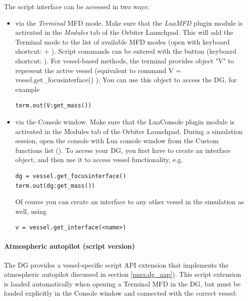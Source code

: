 \documentclass[Orbiter User Manual.tex]{subfiles}
\begin{document}
The script interface can be accessed in two ways:

\begin{itemize}
	\item via the \emph{Terminal} MFD mode. Make sure that the \emph{LuaMFD}
		plugin module is activated in the \emph{Modules} tab of the Orbiter
		Launchpad. This will add the Terminal mode to the list of available MFD
		modes (open with keyboard shortcut:  + ). Script
		commands can be entered with the  button (keyboard shortcut:
		). For vessel-based methods, the terminal provides object "V"
		to represent the active vessel (equivalent to command V =
		vessel.get\_focusinterface() ). You can use this object to access the
		DG, for example

\begin{lstlisting}[language=OSFS]
term.out(V:get_mass())
\end{lstlisting}

	\item via the Console window. Make sure that the LuaConsole plugin module is
		activated in the Modules tab of the Orbiter Launchpad. During a
		simulation session, open the console with Lua console window from the
		Custom functions list (). To access your DG, you
		first have to create an interface object, and then use it to access
		vessel functionality, e.g.

\begin{lstlisting}[language=OSFS]
dg = vessel.get_focusinterface()
term.out(dg:get_mass())
\end{lstlisting}

		Of course you can create an interface to any other vessel in the
		simulation as well, using

\begin{lstlisting}[language=OSFS]
v = vessel.get_interface(<name>)
\end{lstlisting}
\end{itemize}

\paragraph{Atmospheric autopilot (script version)}
The DG provides a vessel-specific script API extension that implements the
atmospheric autopilot discussed in section \ref{para:dg_aap}). This script
extension is loaded automatically when opening a Terminal MFD in the DG, but
must be loaded explicitly in the Console window and connected with the correct
vessel:
\end{document}
